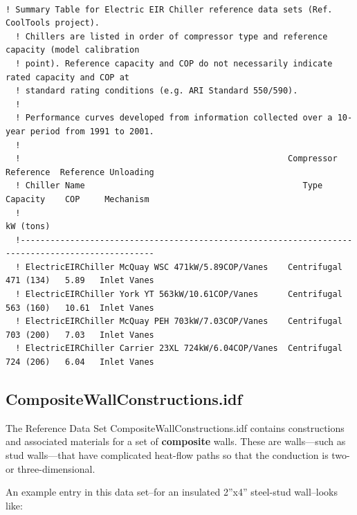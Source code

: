 \begin{lstlisting}

! Summary Table for Electric EIR Chiller reference data sets (Ref. CoolTools project).
  ! Chillers are listed in order of compressor type and reference capacity (model calibration
  ! point). Reference capacity and COP do not necessarily indicate rated capacity and COP at
  ! standard rating conditions (e.g. ARI Standard 550/590).
  !
  ! Performance curves developed from information collected over a 10-year period from 1991 to 2001.
  !
  !                                                      Compressor   Reference  Reference Unloading
  ! Chiller Name                                            Type       Capacity    COP     Mechanism
  !                                                                    kW (tons)
  !-------------------------------------------------------------------------------------------------
  ! ElectricEIRChiller McQuay WSC 471kW/5.89COP/Vanes    Centrifugal   471 (134)   5.89   Inlet Vanes
  ! ElectricEIRChiller York YT 563kW/10.61COP/Vanes      Centrifugal   563 (160)   10.61  Inlet Vanes
  ! ElectricEIRChiller McQuay PEH 703kW/7.03COP/Vanes    Centrifugal   703 (200)   7.03   Inlet Vanes
  ! ElectricEIRChiller Carrier 23XL 724kW/6.04COP/Vanes  Centrifugal   724 (206)   6.04   Inlet Vanes
\end{lstlisting}

\subsection{CompositeWallConstructions.idf}\label{compositewallconstructions.idf}

The Reference Data Set CompositeWallConstructions.idf contains constructions and associated materials for a set of \textbf{composite} walls. These are walls---such as stud walls---that have complicated heat-flow paths so that the conduction is two- or three-dimensional.

An example entry in this data set--for an insulated 2''x4'' steel-stud wall--looks like:

